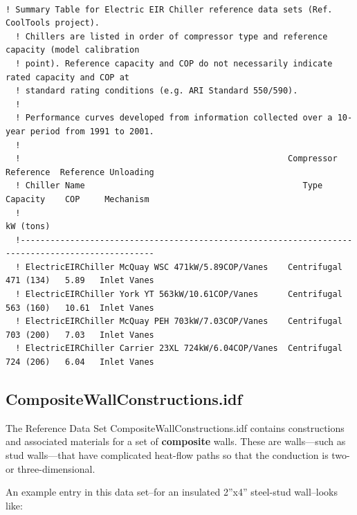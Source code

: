 \begin{lstlisting}

! Summary Table for Electric EIR Chiller reference data sets (Ref. CoolTools project).
  ! Chillers are listed in order of compressor type and reference capacity (model calibration
  ! point). Reference capacity and COP do not necessarily indicate rated capacity and COP at
  ! standard rating conditions (e.g. ARI Standard 550/590).
  !
  ! Performance curves developed from information collected over a 10-year period from 1991 to 2001.
  !
  !                                                      Compressor   Reference  Reference Unloading
  ! Chiller Name                                            Type       Capacity    COP     Mechanism
  !                                                                    kW (tons)
  !-------------------------------------------------------------------------------------------------
  ! ElectricEIRChiller McQuay WSC 471kW/5.89COP/Vanes    Centrifugal   471 (134)   5.89   Inlet Vanes
  ! ElectricEIRChiller York YT 563kW/10.61COP/Vanes      Centrifugal   563 (160)   10.61  Inlet Vanes
  ! ElectricEIRChiller McQuay PEH 703kW/7.03COP/Vanes    Centrifugal   703 (200)   7.03   Inlet Vanes
  ! ElectricEIRChiller Carrier 23XL 724kW/6.04COP/Vanes  Centrifugal   724 (206)   6.04   Inlet Vanes
\end{lstlisting}

\subsection{CompositeWallConstructions.idf}\label{compositewallconstructions.idf}

The Reference Data Set CompositeWallConstructions.idf contains constructions and associated materials for a set of \textbf{composite} walls. These are walls---such as stud walls---that have complicated heat-flow paths so that the conduction is two- or three-dimensional.

An example entry in this data set--for an insulated 2''x4'' steel-stud wall--looks like:

